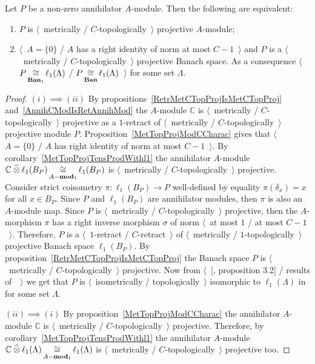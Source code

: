 \begin{proposition}\label{MetTopProjOfAnnihModCharac} Let $P$ be a non-zero
annihilator $A$-module. Then the following are equivalent:

\begin{enumerate}[label = (\roman*)]
    \item $P$ is $\langle$~metrically / $C$-topologically~$\rangle$ projective
    $A$-module;

    \item $\langle$~$A= \{0 \}$ / $A$ has a right identity of norm at most
    $C-1$~$\rangle$ and $P$ is a $\langle$~metrically /
    $C$-topologically~$\rangle$ projective Banach space. As a consequence
    $\langle$~$P\mathop{\mathbin{\cong}}\limits_{\mathbf{Ban}_1}\ell_1(\Lambda)$ /
    $P\mathop{\mathbin{\cong}}\limits_{\mathbf{Ban}}\ell_1(\Lambda)$~$\rangle$ for some set $\Lambda$.
\end{enumerate}
\end{proposition}
\begin{proof} $(i)\implies (ii)$ By 
propositions~\ref{RetrMetCTopProjIsMetCTopProj} 
and~\ref{AnnihCModIsRetAnnihMod} the
$A$-module $\mathbb{C}$ is $\langle$~metrically / $C$-topologically~$\rangle$
projective as a $1$-retract of $\langle$~metrically / $C$-topologically~$\rangle$
projective module $P$. Proposition~\ref{MetTopProjModCCharac} gives that
$\langle$~$A= \{0 \}$ / $A$ has right identity of norm at most $C-1$~$\rangle$.
By corollary~\ref{MetTopProjTensProdWithl1} the annihilator $A$-module
$\mathbb{C}\mathbin{\widehat{\otimes}}\ell_1(B_P)\mathop{\mathbin{\cong}}\limits_{A-\mathbf{mod}_1}\ell_1(B_P)$ is
$\langle$~metrically / $C$-topologically~$\rangle$ projective. Consider strict
coisometry $\pi:\ell_1(B_P)\to P$ well-defined by equality $\pi(\delta_x)=x$ 
for all $x\in B_P$. Since $P$ and $\ell_1(B_P)$ are annihilator modules, 
then $\pi$ is also an $A$-module map. Since $P$ is 
$\langle$~metrically / $C$-topologically~$\rangle$
projective, then the $A$-morphism $\pi$ has a right inverse morphism $\sigma$ of
norm  $\langle$~at most $1$ / at most $C-1$~$\rangle$. Therefore, $P$ is a
$\langle$~$1$-retract / $C$-retract~$\rangle$ of $\langle$~metrically /
$1$-topologically~$\rangle$ projective Banach space $\ell_1(B_P)$. By
proposition~\ref{RetrMetCTopProjIsMetCTopProj} the Banach space $P$ is
$\langle$~metrically / $C$-topologically~$\rangle$ projective. Now from
$\langle$~[\cite{HelMetrFrQMod}, proposition 3.2] / results
of~\cite{KotheTopProjBanSp}~$\rangle$ we get that $P$ is 
$\langle$~isometrically / topologically~$\rangle$ isomorphic to
$\ell_1(\Lambda)$ in for some set $\Lambda$. 

$(ii)\implies (i)$ By proposition~\ref{MetTopProjModCCharac} the annihilator
$A$-module $\mathbb{C}$ is $\langle$~metrically / $C$-topologically~$\rangle$
projective. Therefore, by corollary~\ref{MetTopProjTensProdWithl1} the
annihilator $A$-module
$\mathbb{C}\mathbin{\widehat{\otimes}}\ell_1(\Lambda)\mathop{\mathbin{\cong}}\limits_{A-\mathbf{mod}_1}\ell_1(\Lambda)$ is
$\langle$~metrically / $C$-topologically~$\rangle$ projective too.
\end{proof}


